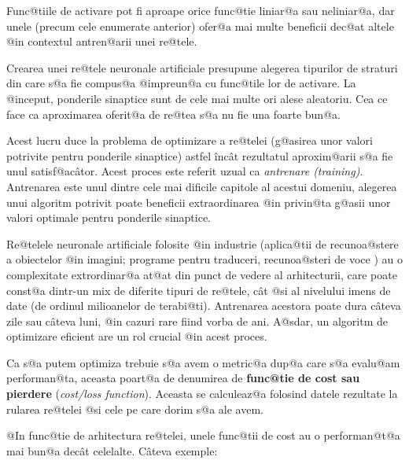 Func@tiile de activare pot fi aproape orice func@tie liniar@a sau neliniar@a, dar unele  (precum cele enumerate anterior) ofer@a mai multe beneficii dec@at altele @in contextul antren@arii unei re@tele.

Crearea unei re@tele neuronale artificiale presupune alegerea tipurilor de straturi din care s@a fie compus@a @impreun@a cu func@tile lor de activare. La @inceput, ponderile sinaptice sunt de cele mai multe ori alese aleatoriu. Cea ce face ca aproximarea oferit@a de re@tea s@a nu fie una foarte bun@a.

Acest lucru duce la problema de optimizare a re@telei (g@asirea unor valori potrivite pentru ponderile sinaptice) astfel \^inc\^ at rezultatul aproxim@arii s@a fie unul satisf@ac\^ ator. Acest proces este referit uzual ca {\sl antrenare (training)}. Antrenarea este unul dintre cele mai dificile capitole al acestui domeniu, alegerea unui algoritm potrivit poate beneficii extraordinarea @in privin@ta g@asii unor valori optimale pentru ponderile sinaptice.

Re@telele neuronale artificiale folosite @in industrie (aplica@tii de recunoa@stere a obiectelor @in imagini; programe pentru traduceri, recunoa@steri de voce ) au o complexitate extrordinar@a at@at din punct de vedere al arhitecturii, care poate const@a dintr-un mix de diferite tipuri de re@tele, c\^ at @si al nivelului imens de date (de ordinul milioanelor de terabi@ti). Antrenarea acestora poate dura c\^ ateva zile sau c\^ ateva luni, @in cazuri rare fiind vorba de ani. A@sdar, un algoritm de optimizare eficient are un rol crucial @in acest proces.

Ca s@a putem optimiza trebuie s@a avem o metric@a dup@a care s@a evalu@am performan@ta, aceasta poart@a de denumirea de \textbf{func@tie de cost sau pierdere} (\textsl{cost/loss function}). Aceasta se calculeaz@a folosind datele rezultate la rularea re@telei @si cele pe care dorim s@a ale avem. 

@In func@tie de arhitectura re@telei, unele func@tii de cost au o performan@t@a mai bun@a dec\^ at celelalte. C\^ ateva exemple:

